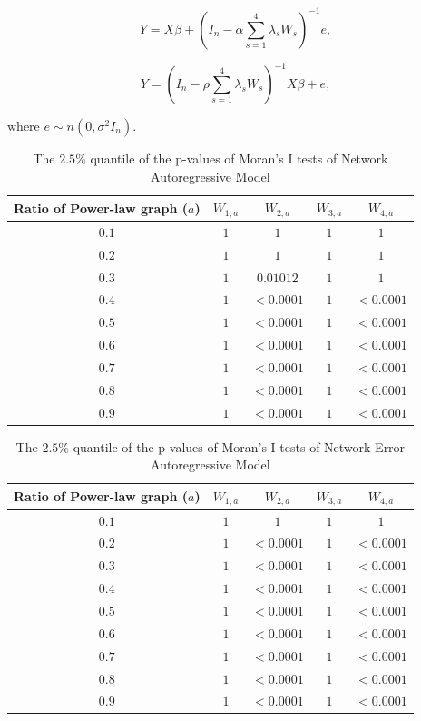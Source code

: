 \documentclass[times, doublespace]{auth}
\begin{document}
\begin{equation}
\label{eqn: 6}
Y = X\beta + (I_{n}-\alpha\sum\limits_{s=1}^{4}\lambda_{s}W_{s})^{-1}e,
\end{equation}

\begin{equation}
\label{eqn: 6a}
Y = (I_{n} - \rho\sum\limits_{s=1}^{4}\lambda_{s}W_{s})^{-1}X\beta + e,
\end{equation}

\noindent where $e\sim n(0,\sigma^{2}I_{n})$. 
\newline

\begin{table}
	\centering
	\caption{The $2.5\%$ quantile of the p-values of Moran's I tests of Network Autoregressive Model}
	\label{table2a}
	\begin{tabular}{|c|c|c|c|c|}
		\hline
		Ratio of Power-law graph ($a$)&$W_{1,a}$&$W_{2,a}$&$W_{3,a}$&$W_{4,a}$\\
		\hline
		$0.1$ & $1$ & $1$ & $1$ & $1$\\
		\hline
		$0.2$ & $1$ & $1$ & $1$ & $1$\\
		\hline
		$0.3$ & $1$ & $0.01012$ & $1$ & $1$\\
		\hline
		$0.4$ & $1$ & $< 0.0001$ & $1$ & $< 0.0001$\\
		\hline
		$0.5$ & $1$ & $< 0.0001$ & $1$ & $< 0.0001$\\
		\hline
		$0.6$ & $1$ & $< 0.0001$ & $1$ & $< 0.0001$\\
		\hline
		$0.7$ & $1$ & $< 0.0001$ & $1$ & $< 0.0001$\\
		\hline
		$0.8$ & $1$ & $< 0.0001$ & $1$ & $< 0.0001$\\
		\hline
		$0.9$ & $1$ & $< 0.0001$ & $1$ & $< 0.0001$\\
		\hline
	\end{tabular}
\end{table}

\begin{table}
	\centering
	\caption{The $2.5\%$ quantile of the p-values of Moran's I tests of Network Error Autoregressive Model}
	\label{table2b}
	\begin{tabular}{|c|c|c|c|c|}
		\hline
		Ratio of Power-law graph ($a$)&$W_{1,a}$&$W_{2,a}$&$W_{3,a}$&$W_{4,a}$\\
		\hline
		$0.1$ & $1$ & $1$ & $1$ & $1$\\
		\hline
		$0.2$ & $1$ & $< 0.0001$ & $1$ & $< 0.0001$\\
		\hline
		$0.3$ & $1$ & $< 0.0001$ & $1$ & $< 0.0001$\\
		\hline
		$0.4$ & $1$ & $< 0.0001$ & $1$ & $< 0.0001$\\
		\hline
		$0.5$ & $1$ & $< 0.0001$ & $1$ & $< 0.0001$\\
		\hline
		$0.6$ & $1$ & $< 0.0001$ & $1$ & $< 0.0001$\\
		\hline
		$0.7$ & $1$ & $< 0.0001$ & $1$ & $< 0.0001$\\
		\hline
		$0.8$ & $1$ & $< 0.0001$ & $1$ & $< 0.0001$\\
		\hline
		$0.9$ & $1$ & $< 0.0001$ & $1$ & $< 0.0001$\\
		\hline
	\end{tabular}
\end{table}
\end{document}
